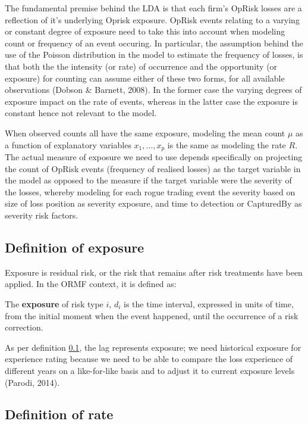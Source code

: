 \documentclass{DissertateUSU}
\begin{document}
The fundamental premise behind the LDA is that each firm's OpRisk losses
are a reflection of it's underlying Oprisk exposure. OpRisk events
relating to a varying or constant degree of exposure need to take this
into account when modeling count or frequency of an event occuring. In
particular, the assumption behind the use of the Poisson distribution in
the model to estimate the frequency of losses, is that both the the
intensity (or rate) of occurrence and the opportunity (or exposure) for
counting can assume either of these two forms, for all available
observations (Dobson \& Barnett, 2008). In the former case the varying
degrees of exposure impact on the rate of events, whereas in the latter
case the exposure is constant hence not relevant to the model.\medskip

When observed counts all have the same exposure, modeling the mean count
\(\mu\) as a function of explanatory variables \(x_{1},\ldots,x_{p}\) is
the same as modeling the rate \(R\). The actual measure of exposure we
need to use depends specifically on projecting the count of OpRisk
events (frequency of realised losses) as the target variable in the
model as opposed to the measure if the target variable were the severity
of the losses, whereby modeling for each rogue trading event the
severity based on size of loss position as severity exposure, and time
to detection or CapturedBy as severity risk factors.

\subsection{Definition of exposure}
\label{ssec:Definition of exposure}

Exposure is residual risk, or the risk that remains after risk
treatments have been applied. In the ORMF context, it is defined as:

\begin{definition}
The  \textbf{exposure} of risk type $i$, $d_{i}$ is the time interval, expressed in units of time, from the initial moment when the event happened, until the occurrence of a risk correction.
\end{definition}

As per definition \ref{ssec:Definition of exposure}, the lag represents
exposure; we need historical exposure for experience rating because we
need to be able to compare the loss experience of different years on a
like-for-like basis and to adjust it to current exposure levels (Parodi,
2014).

\subsection{Definition of rate}
\label{ssec:Definition of rate}
\end{document}
